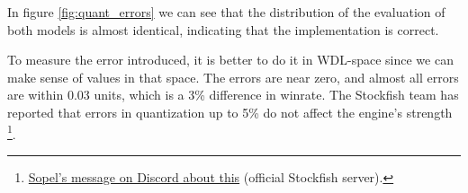 In figure \ref{fig:quant_errors} we can see that the distribution of the evaluation of both models is almost identical, indicating that the implementation is correct.

To measure the error introduced, it is better to do it in WDL-space since we can make sense of values in that space. The errors are near zero, and almost all errors are within 0.03 units, which is a 3\% difference in winrate. The Stockfish team has reported that errors in quantization up to 5\% do not affect the engine's strength \footnote{\href{https://discord.com/channels/435943710472011776/718853716266188890/814260897040039977}{Sopel's message on Discord about this} (official Stockfish server).}.
